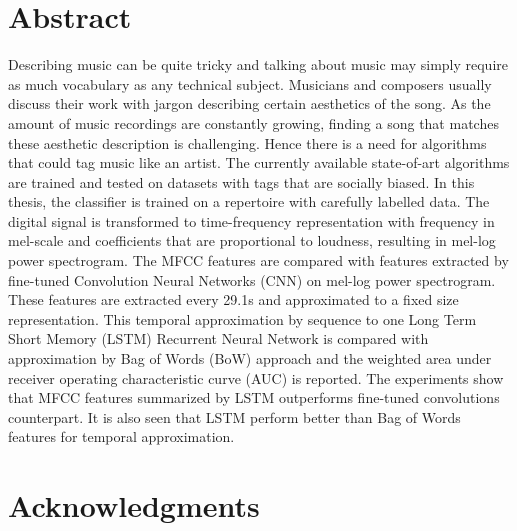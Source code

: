 \documentclass{book}
\begin{document}
\aicescoverpage


\section*{Abstract}

Describing music can be quite tricky and talking about music may simply require as much vocabulary as any technical subject. Musicians and composers usually discuss their work with jargon describing certain aesthetics of the song. As the amount of music recordings are constantly growing, finding a song that matches these aesthetic description is challenging. Hence there is a need for algorithms that could tag music like an artist. The currently available state-of-art algorithms are trained and tested on datasets with tags that are socially biased. In this thesis, the classifier is trained on a repertoire with carefully labelled data. The digital signal is transformed to time-frequency representation with frequency in mel-scale and coefficients that are proportional to loudness, resulting in mel-log power spectrogram. The MFCC features are compared with features extracted by fine-tuned Convolution Neural Networks (CNN) on mel-log power spectrogram. These features are extracted every 29.1s and approximated to a fixed size representation. This temporal approximation by sequence to one Long Term Short Memory (LSTM) Recurrent Neural Network is compared with approximation by Bag of Words (BoW) approach and the weighted area under receiver operating characteristic curve (AUC) is reported. The experiments show that MFCC features summarized by LSTM outperforms fine-tuned convolutions counterpart. It is also seen that LSTM perform better than Bag of Words features for temporal approximation.     

\vspace{5cm}


\newpage

\section*{\bf Acknowledgments}
\end{document}
